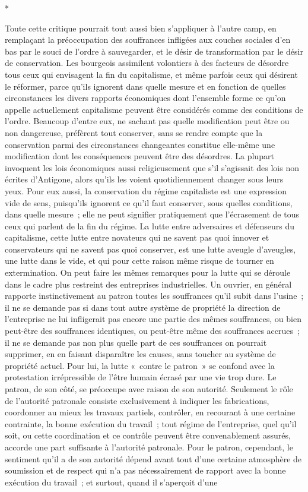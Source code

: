 \documentclass[french,twoside]{book} %
\begin{document}
\begin{center}
*\end{center}
\noindent Toute cette critique pourrait tout aussi bien s'appliquer à l'autre camp, en remplaçant la préoccupation des souffrances infligées aux couches sociales d'en bas par le souci de l'ordre à sauvegarder, et le désir de transformation par le désir de conservation. Les bourgeois assimilent volontiers à des facteurs de désordre tous ceux qui envisagent la fin du capitalisme, et même parfois ceux qui désirent le réformer, parce qu'ils ignorent dans quelle mesure et en fonction de quelles circonstances les divers rapports économiques dont l'ensemble forme ce qu'on appelle actuellement capitalisme peuvent être con­sidérés comme des conditions de l'ordre. Beaucoup d'entre eux, ne sachant pas quelle modification peut être ou non dangereuse, préfèrent tout conserver, sans se rendre compte que la conservation parmi des circonstances changean­tes constitue elle-même une modification dont les conséquences peuvent être des désordres. La plupart invoquent les lois économiques aussi religieusement que s'il s'agissait des lois non écrites d'Antigone, alors qu'ils les voient quotidiennement changer sous leurs yeux. Pour eux aussi, la conservation du régime capitaliste est une expression vide de sens, puisqu'ils ignorent ce qu'il faut conserver, sous quelles conditions, dans quelle mesure ; elle ne peut signifier pratiquement que l'écrasement de tous ceux qui parlent de la fin du régime. La lutte entre adversaires et défenseurs du capitalisme, cette lutte entre novateurs qui ne savent pas quoi innover et conservateurs qui ne savent pas quoi conserver, est une lutte aveugle d'aveugles, une lutte dans le vide, et qui pour cette raison même risque de tourner en extermination. On peut faire les mêmes remarques pour la lutte qui se déroule dans le cadre plus restreint des entreprises industrielles. Un ouvrier, en général rapporte instinctivement au patron toutes les souffrances qu'il subit dans l'usine ; il ne se demande pas si dans tout autre système de propriété la direction de l'entreprise ne lui infligerait pas encore une partie des mêmes souffrances, ou bien peut-être des souffrances identiques, ou peut-être même des souffrances accrues ; il ne se demande pas non plus quelle part de ces souffrances on pourrait supprimer, en en faisant disparaître les causes, sans toucher au système de propriété actuel. Pour lui, la lutte « contre le patron » se confond avec la protestation irrépres­sible de l'être humain écrasé par une vie trop dure. Le patron, de son côté, se préoccupe avec raison de son autorité. Seulement le rôle de l'autorité patronale consiste exclusivement à indiquer les fabrications, coordonner au mieux les travaux partiels, contrôler, en recourant à une certaine contrainte, la bonne exécution du travail ; tout régime de l'entreprise, quel qu'il soit, ou cette coordination et ce contrôle peuvent être convenablement assurés, accorde une part suffisante à l'autorité patronale. Pour le patron, cependant, le sentiment qu'il a de son autorité dépend avant tout d'une certaine atmosphère de soumis­sion et de respect qui n'a pas nécessairement de rapport avec la bonne exécution du travail ; et surtout, quand il s'aperçoit d'une 
\end{document}
